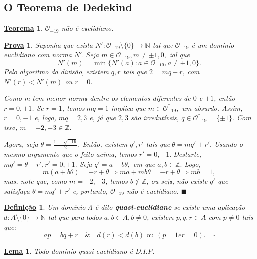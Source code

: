 \documentclass{article}
\newtheorem*{def*}{\underline{Defini\c c\~ao}}
\newtheorem*{theorem*}{\underline{Teorema}}
\newtheorem*{lemma*}{\underline{Lema}}
\newtheorem*{proof*}{\underline{Prova}}
\renewcommand\qedsymbol{$\blacksquare$}
\begin{document}
    \subsection{O Teorema de Dedekind}
    \begin{theorem*}
      \(\mathcal{O}_{-19}\) não é euclidiano.
    \end{theorem*}
    \begin{proof*}
      Suponha que exista \(N':\mathcal{O}_{-19}\setminus{\{0\}}\rightarrow \mathbb{N}\) tal que \(\mathcal{O}_{-19}\) é um domínio euclidiano com norma \(N'.\) Seja \(m\in \mathcal{O}_{-19}, m\neq \pm1, 0,\)
      tal que 
      \[
        N'(m) = \min\{N'(a): a\in \mathcal{O}_{-19}, a\neq \pm1, 0\}.
      \]
      Pelo algoritmo da divisão, existem \(q, r\) tais que \(2 = mq + r\), com \(N'(r) < N'(m)\)
      ou \(r=0\).

      Como m tem menor norma dentre os elementos diferentes de \(0\) e \(\pm 1\), então \(r=0, \pm1\). Se \(r=1\), temos
      \(mq = 1\) implica que \(m\in \mathcal{O}_{-19}^{*},\) um absurdo. Assim, \(r=0, -1\) e,
      logo, \(mq = 2, 3\) e, já que \(2, 3\) são irredutíveis, \(q\in \mathcal{O}_{-19}^{*} = \{\pm1\}.\) Com isso,
      \(m=\pm2, \pm 3\in \mathbb{Z}.\)

      Agora, seja \(\theta = \frac{1 + \sqrt[]{-19}}{2}.\) Então, existem \(q', r'\) tais que \(\theta  = mq'+r'.\) Usando o mesmo
      argumento que o feito acima, temos \(r'=0, \pm1.\) Destarte, \(mq'=\theta - r', r'=0, \pm1.\) Seja \(q'= a + b\theta ,\)
      em que \(a, b\in \mathbb{Z}.\) Logo, 
      \[
        m(a + b\theta ) = -r + \theta  \Rightarrow ma + mb\theta = -r + \theta  \Rightarrow mb = 1,
      \]
      mas, note que, como \(m = \pm2, \pm3\), temos \(b\not\in \mathbb{Z}\), ou seja, não existe \(q'\) que satisfaça \(\theta  = mq' + r'\) e, portanto,
      \(\mathcal{O}_{-19}\) não é euclidiano. \qedsymbol
    \end{proof*}
    \begin{def*}
      Um domínio A é dito \textbf{quasi-euclidiano} se existe uma aplicação \(d:A\setminus{\{0\}}\rightarrow \mathbb{N}\) tal que para todos \(a, b\in A, b\neq0\),
      existem \(p, q, r\in A\) com \(p\neq0\) tais que: 
      \[
        ap = bq + r\quad\&\quad d(r) < d(b) \text{ ou } (p=1 e r=0).\quad\square
      \]
    \end{def*}
    \begin{lemma*}
      Todo domínio quasi-euclidiano é D.I.P.
    \end{lemma*}
\end{document}
